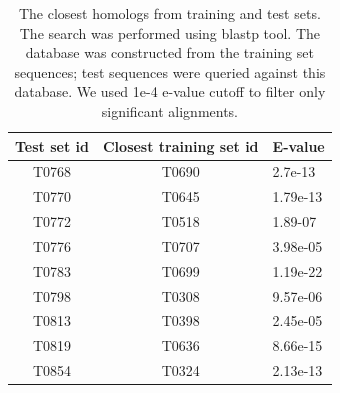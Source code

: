 \documentclass[a4paper,10pt]{article}
\begin{document}
\begin{table}[H]
\begin{center}
\begin{tabular}{ c | c | l }
    
    Test set id & Closest training set id & E-value \\
    \hline
    T0768 & T0690 & 2.7e-13\\
    T0770 & T0645 & 1.79e-13\\
    T0772 & T0518 & 1.89-07\\
    T0776 & T0707 & 3.98e-05\\
    T0783 & T0699 & 1.19e-22\\
    T0798 & T0308 & 9.57e-06\\
    T0813 & T0398 & 2.45e-05\\
    T0819 & T0636 & 8.66e-15\\
    T0854 & T0324 & 2.13e-13\\
    
\end{tabular}
    
    \caption {The closest homologs from training and test sets. The search was performed using blastp tool. The database was constructed from 
    the training set sequences; test sequences were queried against this database. We used 1e-4 e-value cutoff to filter only significant 
    alignments.}
    \label{Tbl:datasetsSimilarity}
\end{center}
\end{table}
\end{document}
